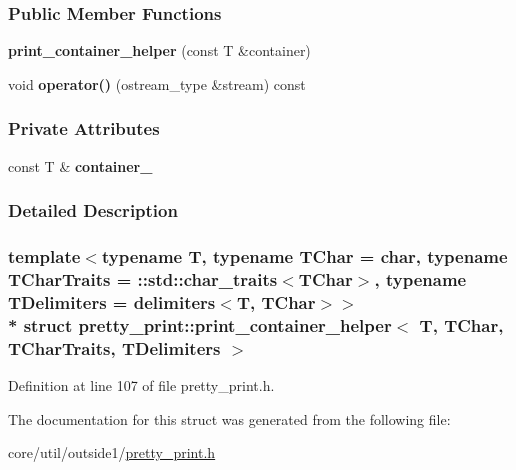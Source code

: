 \subsubsection*{Public Member Functions}
\begin{DoxyCompactItemize}
\item 
{\bfseries print\+\_\+container\+\_\+helper} (const T \&container)\hypertarget{structpretty__print_1_1print__container__helper_a95d852ee373f7dda926c62a54a49d66f}{}\label{structpretty__print_1_1print__container__helper_a95d852ee373f7dda926c62a54a49d66f}

\item 
void {\bfseries operator()} (ostream\+\_\+type \&stream) const \hypertarget{structpretty__print_1_1print__container__helper_af4f8639d3924c3458d9daa212579305a}{}\label{structpretty__print_1_1print__container__helper_af4f8639d3924c3458d9daa212579305a}

\end{DoxyCompactItemize}
\subsubsection*{Private Attributes}
\begin{DoxyCompactItemize}
\item 
const T \& {\bfseries container\+\_\+}\hypertarget{structpretty__print_1_1print__container__helper_ae66120f64952ac29b0100798eb394191}{}\label{structpretty__print_1_1print__container__helper_ae66120f64952ac29b0100798eb394191}

\end{DoxyCompactItemize}


\subsubsection{Detailed Description}
\subsubsection*{template$<$typename T, typename T\+Char = char, typename T\+Char\+Traits = \+::std\+::char\+\_\+traits$<$\+T\+Char$>$, typename T\+Delimiters = delimiters$<$\+T, T\+Char$>$$>$\\*
struct pretty\+\_\+print\+::print\+\_\+container\+\_\+helper$<$ T, T\+Char, T\+Char\+Traits, T\+Delimiters $>$}



Definition at line 107 of file pretty\+\_\+print.\+h.



The documentation for this struct was generated from the following file\+:\begin{DoxyCompactItemize}
\item 
core/util/outside1/\hyperlink{pretty__print_8h}{pretty\+\_\+print.\+h}\end{DoxyCompactItemize}
